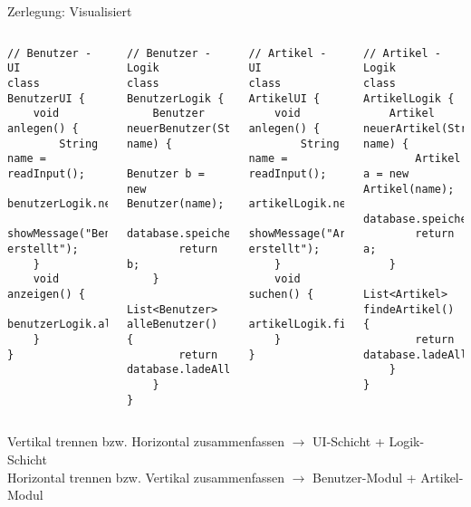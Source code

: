 \begin{frame}[fragile]{Zerlegung: Visualisiert}
  \vspace{-0.25cm}
  \begin{columns}[T]
    \begin{lstlisting}[style=java, basicstyle=\tiny\ttfamily]
// Benutzer - UI
class BenutzerUI {
    void anlegen() {
        String name = readInput();
        benutzerLogik.neuerBenutzer(name);
        showMessage("Benutzer erstellt");
    }
    void anzeigen() {
        benutzerLogik.alleBenutzer();
    }
}
    \end{lstlisting}
    \vspace{-0.25cm}
    \begin{lstlisting}[style=java, basicstyle=\tiny\ttfamily]
// Benutzer - Logik
class BenutzerLogik {
    Benutzer neuerBenutzer(String name) {
        Benutzer b = new Benutzer(name);
        database.speichereBenutzer(b);
        return b;
    }
    List<Benutzer> alleBenutzer() {
        return database.ladeAlleBenutzer();
    }
}
    \end{lstlisting}

    \begin{lstlisting}[style=java, basicstyle=\tiny\ttfamily]
// Artikel - UI
class ArtikelUI {
    void anlegen() {
        String name = readInput();
        artikelLogik.neuerArtikel(name);
        showMessage("Artikel erstellt");
    }
    void suchen() {
        artikelLogik.findeArtikel();
    }
}
    \end{lstlisting}
    \vspace{-0.25cm}
    \begin{lstlisting}[style=java, basicstyle=\tiny\ttfamily]
// Artikel - Logik
class ArtikelLogik {
    Artikel neuerArtikel(String name) {
        Artikel a = new Artikel(name);
        database.speichereArtikel(a);
        return a;
    }
    List<Artikel> findeArtikel() {
        return database.ladeAlleArtikel();
    }
}
    \end{lstlisting}
  \end{columns}

  Vertikal trennen bzw. Horizontal zusammenfassen $\rightarrow$ UI-Schicht + Logik-Schicht\\
  Horizontal trennen bzw. Vertikal zusammenfassen $\rightarrow$ Benutzer-Modul + Artikel-Modul
\end{frame}

